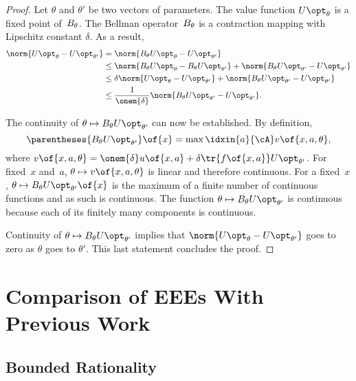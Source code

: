 \begin{proof}
Let \(\theta\) and \(\theta'\) be two vectors of parameters.
The value function \(\Utheta\) is a fixed point of~\(B_{\theta}\). The Bellman operator~\(B_{\theta}\) is a contraction mapping with Lipschitz constant \(\delta\). As a result,
\begin{align*}
\norm{\Utheta - \Uthetap} &= \norm{\Btheta \Utheta - \Uthetap} \\
&\le \norm{\Btheta \Utheta - \Btheta \Uthetap} + \norm{\Btheta\Uthetap - \Uthetap} \\
&\le \delta \norm{\Utheta - \Uthetap} + \norm{\Btheta\Uthetap - \Uthetap} \\
&\le \frac{1}{\onem{\delta}} \norm{\Btheta\Uthetap - \Uthetap}.
\end{align*}

The continuity of \(\theta \mapsto \Btheta \Uthetap\) can now be established.
By definition,
\begin{equation*}
\parentheses{\Btheta \Uthetap} \of{x} = \max\idxin{a}{\cA} v \of{x, a, \theta},
\end{equation*}
where \(v \of{x, a, \theta} = \onem{\delta} u \of{x, a} + \delta \tr{f \of{x, a}} \Uthetap\).
For fixed~\(x\) and~\(a\), \(\theta \mapsto v \of{x, a, \theta}\) is linear and therefore continuous.
For a fixed~\(x\), \(\theta \mapsto \Btheta \Uthetap \of{x}\) is the maximum of a finite number of continuous functions and as such is continuous.
The function \(\theta \mapsto \Btheta \Uthetap\) is continuous because each of its finitely many components is continuous.

Continuity of \(\theta \mapsto \Btheta \Uthetap\) implies that \(\norm{\Utheta - \Uthetap}\) goes to zero as \(\theta\) goes to \(\theta'\).
This last statement concludes the proof.
\end{proof}


\section{Comparison of EEEs With Previous Work}
\label{sec:comparison_of_eees_with_previous_work}


\subsection{Bounded Rationality}

